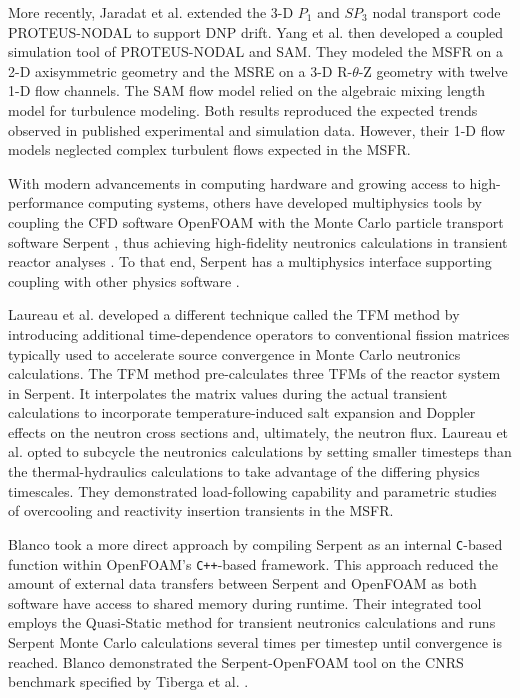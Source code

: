 More recently, Jaradat et al. \cite{jaradat_development_2021}
extended the 3-D $P_1$ and $SP_3$ nodal transport code PROTEUS-NODAL to support \gls{DNP} drift.
Yang et al. \cite{yang_development_2022} then developed a coupled simulation tool of PROTEUS-NODAL
and \gls{SAM}. They modeled the \gls{MSFR} on a 2-D axisymmetric geometry
and the \gls{MSRE} on a 3-D R-$\theta$-Z geometry with twelve 1-D flow channels. The \gls{SAM} flow
model relied on the algebraic mixing length model for turbulence modeling. Both results
reproduced the expected trends observed in published experimental and simulation data. However,
their 1-D flow models neglected complex turbulent flows expected in the \gls{MSFR}.

With modern advancements in computing hardware and growing access to
high-performance computing systems, others have developed multiphysics tools by
coupling the \gls{CFD} software OpenFOAM
\cite{the_openfoam_foundation_ltd_openfoam_2021} with the Monte Carlo particle
transport software Serpent \cite{leppanen_serpent_2014}, thus achieving
high-fidelity neutronics calculations in transient reactor analyses \cite{laureau_transient_2017,
blanco_neutronic_2020}. To that end, Serpent has a multiphysics interface supporting coupling
with other physics software \cite{leppanen_development_2013}.

Laureau et al.
\cite{laureau_transient_2017} developed a different technique called the
\gls{TFM} method by introducing additional time-dependence
operators to conventional fission matrices typically used to accelerate source
convergence in Monte Carlo neutronics calculations. The \gls{TFM} method
pre-calculates three \glspl{TFM} of the reactor system in Serpent. It
interpolates the matrix values during the actual transient calculations to
incorporate temperature-induced salt expansion and Doppler effects on the neutron cross sections
and, ultimately, the neutron flux. Laureau et al. opted to subcycle the neutronics calculations by
setting smaller timesteps than the thermal-hydraulics calculations
to take advantage of the differing physics timescales. They demonstrated load-following capability
and parametric studies of overcooling and reactivity insertion transients in the \gls{MSFR}.

Blanco \cite{blanco_neutronic_2020} took a more direct approach by
compiling Serpent as an internal \texttt{C}-based function within OpenFOAM's
\texttt{C++}-based framework. This approach reduced the amount of external data
transfers between Serpent and OpenFOAM as both software have access to shared
memory during runtime. Their integrated tool employs the Quasi-Static
method for transient neutronics calculations and runs Serpent Monte Carlo
calculations several times per timestep until convergence is reached.
Blanco demonstrated the Serpent-OpenFOAM tool on the CNRS benchmark specified by Tiberga et al.
\cite{tiberga_results_2020}.

